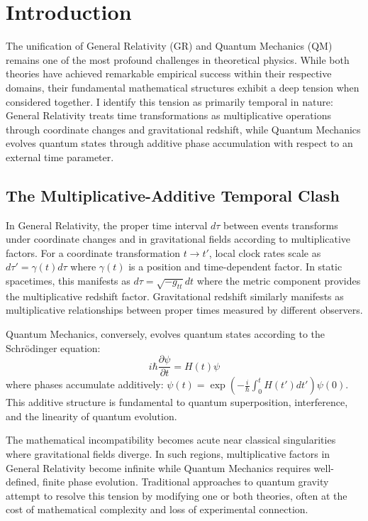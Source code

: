 \section{Introduction}
\label{sec:introduction}

The unification of General Relativity (GR) and Quantum Mechanics (QM) remains one of the most profound challenges in theoretical physics. While both theories have achieved remarkable empirical success within their respective domains, their fundamental mathematical structures exhibit a deep tension when considered together. I identify this tension as primarily temporal in nature: General Relativity treats time transformations as multiplicative operations through coordinate changes and gravitational redshift, while Quantum Mechanics evolves quantum states through additive phase accumulation with respect to an external time parameter.

\subsection{The Multiplicative-Additive Temporal Clash}

In General Relativity, the proper time interval $d\tau$ between events transforms under coordinate changes and in gravitational fields according to multiplicative factors. For a coordinate transformation $t \to t'$, local clock rates scale as $d\tau' = \gamma(t) d\tau$ where $\gamma(t)$ is a position and time-dependent factor. In static spacetimes, this manifests as $d\tau = \sqrt{-g_{tt}} dt$ where the metric component provides the multiplicative redshift factor. Gravitational redshift similarly manifests as multiplicative relationships between proper times measured by different observers.

Quantum Mechanics, conversely, evolves quantum states according to the Schrödinger equation:
\begin{equation}
i\hbar \frac{\partial \psi}{\partial t} = H(t) \psi
\end{equation}
where phases accumulate additively: $\psi(t) = \exp\left(-\frac{i}{\hbar}\int_0^t H(t') dt'\right) \psi(0)$. This additive structure is fundamental to quantum superposition, interference, and the linearity of quantum evolution.

The mathematical incompatibility becomes acute near classical singularities where gravitational fields diverge. In such regions, multiplicative factors in General Relativity become infinite while Quantum Mechanics requires well-defined, finite phase evolution. Traditional approaches to quantum gravity attempt to resolve this tension by modifying one or both theories, often at the cost of mathematical complexity and loss of experimental connection.

